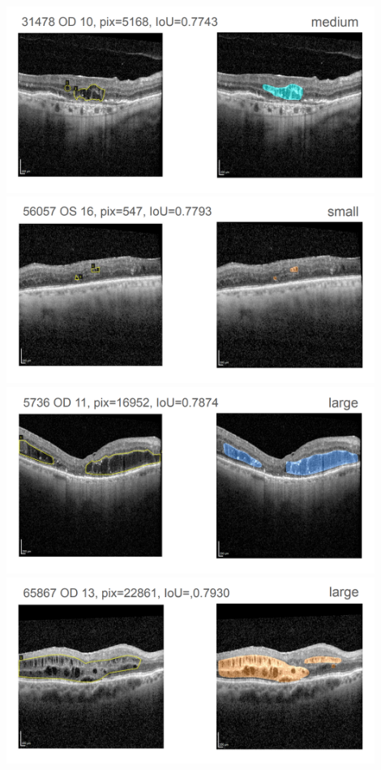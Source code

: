 \includegraphics[width=0.9\textwidth]{./pic/Segmentierung/Segmentierungsergebnisse/33.PNG}
\includegraphics[width=0.9\textwidth]{./pic/Segmentierung/Segmentierungsergebnisse/34.PNG}
\includegraphics[width=0.9\textwidth]{./pic/Segmentierung/Segmentierungsergebnisse/35.PNG}
\includegraphics[width=0.9\textwidth]{./pic/Segmentierung/Segmentierungsergebnisse/36.PNG}
